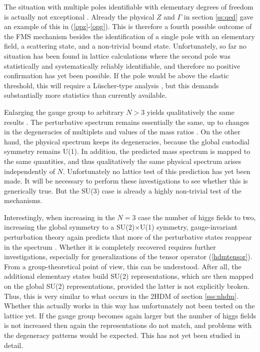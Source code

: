 \documentclass[final,twoside,12pt]{article}
\newcommand*{\pref}[1]{(\ref{#1})}
\newcommand*{\prefr}[2]{(\ref{#1}-\ref{#2})}
\newcommand*{\1}{1\!\!\!\bot}
\begin{document}
The situation with multiple poles identifiable with elementary degrees of freedom is actually not exceptional \cite{Maas:2017xzh}. Already the physical $Z$ and $\Gamma$ in section \ref{ss:qed} gave an example of this in \prefr{opz}{opg}. This is therefore a fourth possible outcome of the FMS mechanism besides the identification of a single pole with an elementary field, a scattering state, and a non-trivial bound state. Unfortunately, so far no situation has been found in lattice calculations where the second pole was statistically and systematically reliably identifiable, and therefore no positive confirmation has yet been possible. If the pole would be above the elastic threshold, this will require a L\"uscher-type analysis \cite{Gattringer:2010zz,Luscher:1990ux,Luscher:1991cf}, but this demands substantially more statistics than currently available.

Enlarging the gauge group to arbitrary $N>3$ yields qualitatively the same results \cite{Maas:2017xzh}. The perturbative spectrum remains essentially the same, up to changes in the degeneracies of multiplets and values of the mass ratios \cite{Bohm:2001yx,Maas:2017xzh}. On the other hand, the physical spectrum keeps its degeneracies, because the global custodial symmetry remains U(1). In addition, the predicted mass spectrum is mapped to the same quantities, and thus qualitatively the same physical spectrum arises independently of $N$. Unfortunately no lattice test of this prediction has yet been made. It will be necessary to perform these investigations to see whether this is generically true. But the SU(3) case is already a highly non-trivial test of the mechanisms.

Interestingly, when increasing in the $N=3$ case the number of higgs fields to two, increasing the global symmetry to a SU(2)$\times$U(1) symmetry, gauge-invariant perturbation theory again predicts that more of the perturbative states reappear in the spectrum \cite{Torek:2015ssa,Maas:2017xzh}. Whether it is completely recovered requires further investigations, especially for generalizations of the tensor operator \pref{hdmtensor}. From a group-theoretical point of view, this can be understood. After all, the additional elementary states build SU(2) representations, which are then mapped on the global SU(2) representations, provided the latter is not explicitly broken. Thus, this is very similar to what occurs in the 2HDM of section \ref{sss:nhdm}. Whether this actually works in this way has unfortunately not been tested on the lattice yet. If the gauge group becomes again larger but the number of higgs fields is not increased then again the representations do not match, and problems with the degeneracy patterns would be expected. This has not yet been studied in detail.
\end{document}
